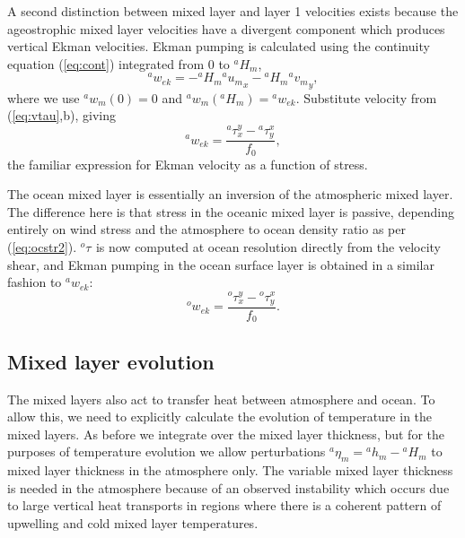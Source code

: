 \documentclass[11pt, a4paper,twoside]{article}
\newcommand{\etb}[2]{{{}^{#1}\eta_{#2}}}
\newcommand{\uu}[2]{{{}^{#1}u_{#2}}}
\newcommand{\vv}[2]{{{}^{#1}v_{#2}}}
\newcommand{\ww}[2]{{{}^{#1}w_{#2}}}
\newcommand{\ek}[1]{{{}^{#1}w_{ek}}}
\newcommand{\HH}[2]{{{}^{#1}H_{#2}}}
\newcommand{\h}[2]{{{}^{#1}h_{#2}}}
\newcommand{\tx}[2]{{}^{#1}\tau^{#2}}
\numberwithin{equation}{section}
\begin{document}
A second distinction between mixed layer and layer 1 velocities exists because the ageostrophic mixed layer velocities have a divergent component which produces vertical Ekman velocities.
Ekman pumping is calculated using the continuity equation (\ref{eq:cont}) integrated from $0$ to $\HH{a}{m}$,
\begin{equation}\label{eq:wek1}
 \ek{a} = - \HH{a}{m} \uu{a}{m}_x - \HH{a}{m} \vv{a}{m}_y,
\end{equation}
where we use $\ww{a}{m}(0)=0$ and $\ww{a}{m}(\HH{a}{m}) = \ek{a}$.
Substitute velocity from (\ref{eq:vtau},b), giving
\begin{equation}\label{eq:atek}
\ek{a}  = \frac{\tx{a}{y}_x - \tx{a}{x}_y}{f_0},
\end{equation}
the familiar expression for Ekman velocity as a function of stress.

The ocean mixed layer is essentially an inversion of the atmospheric mixed layer.
The difference here is that stress in the oceanic mixed layer is passive,  depending entirely on wind stress and the atmosphere to ocean density ratio as per (\ref{eq:ocstr2}).
$\tx{o}{}$ is now computed at ocean resolution directly from the velocity shear,
and Ekman pumping in the ocean surface layer is obtained in a similar fashion to $\ek{a}$:
\begin{equation}\label{eq:ocek}
\ek{o}  = \frac{\tx{o}{y}_x - \tx{o}{x}_y}{f_0}.
\end{equation}


\subsection{Mixed layer evolution}
The mixed layers also act to transfer heat between atmosphere and ocean.
To allow this, we need to explicitly calculate the evolution of temperature in the mixed layers.
As before we integrate over the mixed layer thickness,  but for the purposes of temperature evolution we allow perturbations $\etb{a}{m} = \h{a}{m} - \HH{a}{m} $ to mixed layer thickness in the atmosphere only.
The variable mixed layer thickness is needed in the atmosphere because of an observed instability which occurs due to large vertical heat transports in regions where there is a coherent pattern of upwelling and cold mixed layer temperatures.
\end{document}
